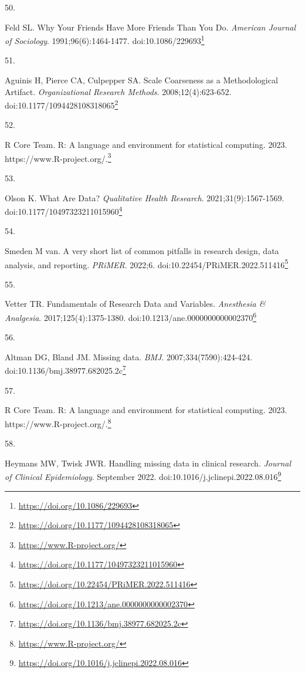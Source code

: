 \documentclass[
  a4paper,
]{book}
\newlength{\cslhangindent}
\newlength{\csllabelwidth}
\newlength{\cslentryspacingunit} %
\newenvironment{CSLReferences}[2] %
 {%
  \setlength{\parindent}{0pt}
  \ifodd #1
  \let\oldpar\par
  \def\par{\hangindent=\cslhangindent\oldpar}
  \fi
  \setlength{\parskip}{#2\cslentryspacingunit}
 }%
 {}
\newcommand{\CSLLeftMargin}[1]{\parbox[t]{\csllabelwidth}{#1}}
\newcommand{\CSLRightInline}[1]{\parbox[t]{\linewidth - \csllabelwidth}{#1}\break}
\renewcommand{\href}[2]{#2\footnote{\url{#1}}}
\begin{document}
\begin{CSLReferences}{0}{0}
\leavevmode{}%
\CSLLeftMargin{50. }%
\CSLRightInline{Feld SL. Why Your Friends Have More Friends Than You Do. \emph{American Journal of Sociology}. 1991;96(6):1464-1477. doi:\href{https://doi.org/10.1086/229693}{10.1086/229693}}

\leavevmode{}%
\CSLLeftMargin{51. }%
\CSLRightInline{Aguinis H, Pierce CA, Culpepper SA. Scale Coarseness as a Methodological Artifact. \emph{Organizational Research Methods}. 2008;12(4):623-652. doi:\href{https://doi.org/10.1177/1094428108318065}{10.1177/1094428108318065}}

\leavevmode{}%
\CSLLeftMargin{52. }%
\CSLRightInline{R Core Team. R: A language and environment for statistical computing. 2023. \href{https://www.R-project.org/}{https://www.R-project.org/.}}

\leavevmode{}%
\CSLLeftMargin{53. }%
\CSLRightInline{Olson K. What Are Data? \emph{Qualitative Health Research}. 2021;31(9):1567-1569. doi:\href{https://doi.org/10.1177/10497323211015960}{10.1177/10497323211015960}}

\leavevmode{}%
\CSLLeftMargin{54. }%
\CSLRightInline{Smeden M van. A very short list of common pitfalls in research design, data analysis, and reporting. \emph{PRiMER}. 2022;6. doi:\href{https://doi.org/10.22454/PRiMER.2022.511416}{10.22454/PRiMER.2022.511416}}

\leavevmode{}%
\CSLLeftMargin{55. }%
\CSLRightInline{Vetter TR. Fundamentals of Research Data and Variables. \emph{Anesthesia \& Analgesia}. 2017;125(4):1375-1380. doi:\href{https://doi.org/10.1213/ane.0000000000002370}{10.1213/ane.0000000000002370}}

\leavevmode{}%
\CSLLeftMargin{56. }%
\CSLRightInline{Altman DG, Bland JM. Missing data. \emph{BMJ}. 2007;334(7590):424-424. doi:\href{https://doi.org/10.1136/bmj.38977.682025.2c}{10.1136/bmj.38977.682025.2c}}

\leavevmode{}%
\CSLLeftMargin{57. }%
\CSLRightInline{R Core Team. R: A language and environment for statistical computing. 2023. \href{https://www.R-project.org/}{https://www.R-project.org/.}}

\leavevmode{}%
\CSLLeftMargin{58. }%
\CSLRightInline{Heymans MW, Twisk JWR. Handling missing data in clinical research. \emph{Journal of Clinical Epidemiology}. September 2022. doi:\href{https://doi.org/10.1016/j.jclinepi.2022.08.016}{10.1016/j.jclinepi.2022.08.016}}


\end{CSLReferences}
\end{document}

